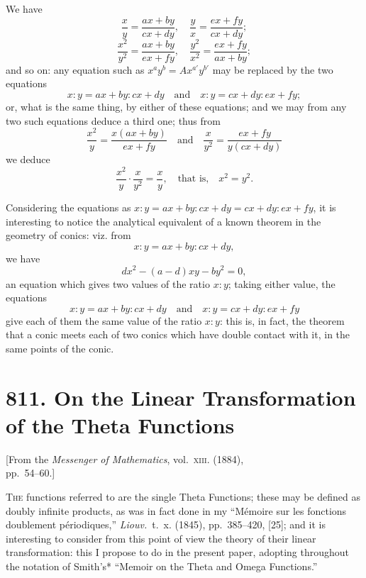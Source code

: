 \documentclass[11pt,a4paper]{book}
\begin{document}
We have
\[
\frac{x}{y} = \frac{ax+by}{cx+dy},\quad \frac{y}{x} = \frac{ex+fy}{cx+dy};
\]
\[
\frac{x^2}{y^2} = \frac{ax+by}{ex+fy},\quad \frac{y^2}{x^2} = \frac{ex+fy}{ax+by};
\]
and so on: any equation such as $x^a y^b = Ax^{a'}y^{b'}$ may be replaced by the two equations
\[
x : y = ax + by : cx + dy\quad\text{and}\quad x : y = cx + dy : ex + fy;
\]
or, what is the same thing, by either of these equations; and we may from any two such equations deduce a third one; thus from
\[
\frac{x^2}{y} = \frac{x(ax+by)}{ex+fy}\quad\text{and}\quad \frac{x}{y^2} = \frac{ex+fy}{y(cx+dy)}
\]
we deduce
\[
\frac{x^2}{y}\cdot\frac{x}{y^2} = \frac{x}{y},\quad\text{that is,}\quad x^2 = y^2.
\]

Considering the equations as $x:y = ax+by : cx+dy = cx+dy : ex+fy$, it is interesting to notice the analytical equivalent of a known theorem in the geometry of conics: viz. from
\[
x:y = ax+by : cx+dy,
\]
we have
\[
dx^2 - (a-d)xy - by^2 = 0,
\]
an equation which gives two values of the ratio $x:y$; taking either value, the equations
\[
x:y = ax+by : cx+dy\quad\text{and}\quad x:y = cx+dy : ex+fy
\]
give each of them the same value of the ratio $x:y$: this is, in fact, the theorem that a conic meets each of two conics which have double contact with it, in the same points of the conic.



\newpage
\section*{811. On the Linear Transformation of the Theta Functions}

\begin{center}
\small[From the \textit{Messenger of Mathematics}, vol.~\textsc{xiii}. (1884),\\
pp.~54--60.]
\end{center}

\bigskip

\noindent
\textsc{The} functions referred to are the single Theta Functions; these may be defined as doubly infinite products, as was in fact done in my ``M\'{e}moire sur les fonctions doublement p\'{e}riodiques,'' \textit{Liouv.}\ t.~x. (1845), pp.~385--420, [25]; and it is interesting to consider from this point of view the theory of their linear transformation: this I propose to do in the present paper, adopting throughout the notation of Smith's* ``Memoir on the Theta and Omega Functions.''
\end{document}
